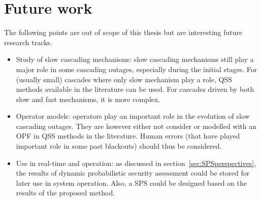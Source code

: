 \section{Future work}

The following points are out of scope of this thesis but are interesting future research tracks.

\begin{itemize}
    \item Study of slow cascading mechanisms: slow cascading mechanisms still play a major role in some cascading outages, especially during the initial stages. For (usually small) cascades where only slow mechanism play a role, QSS methods available in the literature can be used. For cascades driven by both slow and fast mechanisms, it is more complex. %
    \item Operator models: operators play an important role in the evolution of slow cascading outages. They are however either not consider or modelled with an OPF in QSS methods in the literature. Human errors (that have played important role in some past blackouts) should thus be considered.
    \item Use in real-time and operation: as discussed in section~\ref{sec:SPSperspectives}, the results of dynamic probabilistic security assessment could be stored for later use in system operation. Also, a SPS could be designed based on the results of the proposed method.
\end{itemize}




